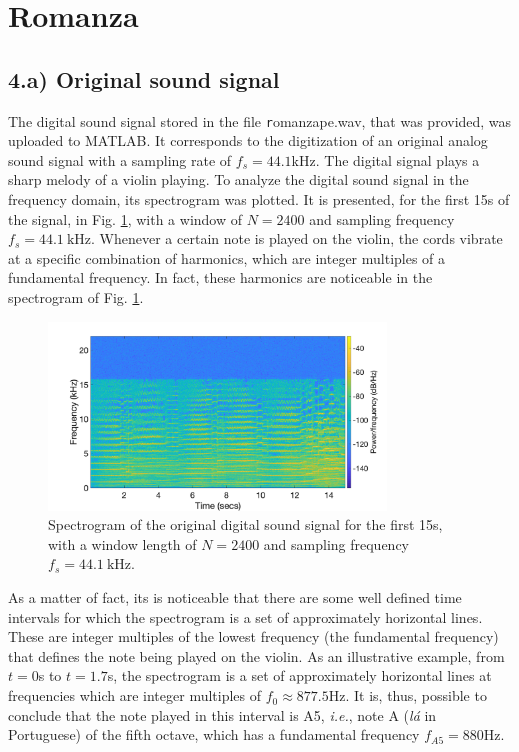 \documentclass[a4paper, oneside, 11pt]{article}
\begin{document}
\newpage
\section{Romanza}

\subsection{4.a) Original sound signal}\label{sec:4}
The digital sound signal stored in the file {\texttt romanza\textunderscore pe.wav}, that was provided, was uploaded to MATLAB\texttrademark. It corresponds to the digitization of an original analog sound signal with a sampling rate of $f_s = 44.1$kHz. The digital signal plays a sharp melody of a violin playing. To analyze the digital sound signal in the frequency domain, its spectrogram was plotted. It is presented, for the first 15s of the signal, in Fig. \ref{fig:spctOriginal}, with a window of $N = 2400$ and sampling frequency $f_s = \SI{44.1}{\kilo \hertz}$. Whenever a certain note is played on the violin, the cords vibrate at a specific combination of harmonics, which are integer multiples of a fundamental frequency. In fact, these harmonics are noticeable in the spectrogram of Fig. \ref{fig:spctOriginal}.

\begin{figure}[h!]
	\centering
	\includegraphics[width=0.8\textwidth]{figures/spect_original.png}
	\caption{Spectrogram of the original digital sound signal for the first 15s, with a window length of $N = 2400$ and sampling frequency $f_s = \SI{44.1}{\kilo \hertz}$.}
	\label{fig:spctOriginal}
\end{figure}

As a matter of fact, its is noticeable that there are some well defined time intervals for which the spectrogram is a set of approximately horizontal lines. These are integer multiples of the lowest frequency (the fundamental frequency) that defines the note being played on the violin. As an illustrative example, from $t=0$s to $t=1.7$s, the spectrogram is a set of approximately horizontal lines at frequencies which are integer multiples of $f_0 \approx 877.5$Hz. It is, thus, possible to conclude that the note played in this interval is A5, \textit{i.e.}, note A (\textit{lá} in Portuguese) of the fifth octave, which has a fundamental frequency $f_{A5} = 880$Hz.
\end{document}
